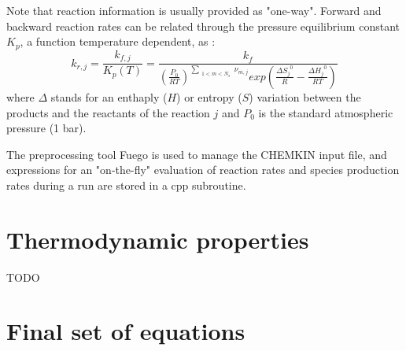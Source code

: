 Note that reaction information is usually provided as "one-way". Forward and backward reaction rates can be related through the {pressure equilibrium constant} $K_{p}$, a function temperature dependent, as : 
\begin{equation}
k_{r,j} = \frac{k_{f,j}}{K_{p}(T)} =\frac{k_{f}}{ {\left( \frac{P_0}{RT} \right)}^{\sum_{\substack{1<m<N_s}} \nu_{m,j}} exp \left( \frac{\Delta {S_j}^{0}}{R} - \frac{\Delta {H_j}^{0}}{RT} \right) }
\end{equation}
where $ \Delta$ stands for an enthaply ($H$) or entropy ($S$) variation between the products and the reactants of the reaction $j$ and $P_0$ is the standard atmospheric pressure (1 bar).

The preprocessing tool Fuego is used to manage the CHEMKIN input file, and expressions for an "on-the-fly" evaluation of reaction rates and species production rates during a \pelelm \; run are stored in a cpp subroutine.

\section{Thermodynamic properties}
\label{ThermoProp}
TODO


\section{Final \pelelm  \;  set of equations}
\label{SumUpEq}

